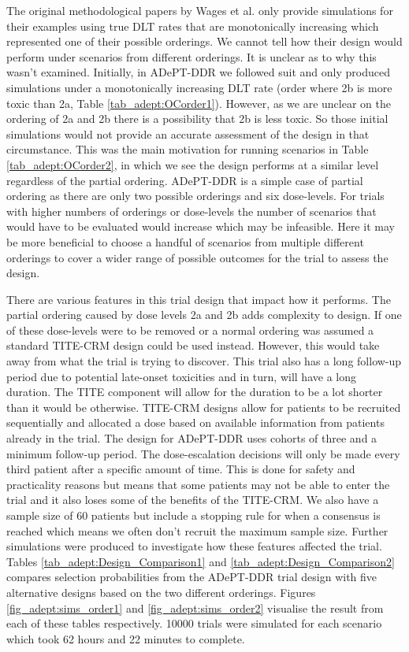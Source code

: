 The original methodological papers by Wages et al. \cite{wagesUsingTimetoeventContinual2013,wagesContinualReassessmentMethod2011} only provide simulations for their examples using true DLT rates that are monotonically increasing which represented one of their possible orderings. We cannot tell how their design would perform under scenarios from different orderings. It is unclear as to why this wasn't examined. Initially, in ADePT-DDR we followed suit and only produced simulations under a monotonically increasing DLT rate (order where 2b is more toxic than 2a, Table \ref{tab_adept:OCorder1}). However, as we are unclear on the ordering of 2a and 2b there is a possibility that 2b is less toxic. So those initial simulations would not provide an accurate assessment of the design in that circumstance. This was the main motivation for running scenarios in Table \ref{tab_adept:OCorder2}, in which we see the design performs at a similar level regardless of the partial ordering. ADePT-DDR is a simple case of partial ordering as there are only two possible orderings and six dose-levels. For trials with higher numbers of orderings or dose-levels the number of scenarios that would have to be evaluated would increase which may be infeasible. Here it may be more beneficial to choose a handful of scenarios from multiple different orderings to cover a wider range of possible outcomes for the trial to assess the design. 

There are various features in this trial design that impact how it performs. The partial ordering caused by dose levels 2a and 2b adds complexity to design. If one of these dose-levels were to be removed or a normal ordering was assumed a standard TITE-CRM design could be used instead. However, this would take away from what the trial is trying to discover. This trial also has a long follow-up period due to potential late-onset toxicities and in turn, will have a long duration. The TITE component will allow for the duration to be a lot shorter than it would be otherwise. TITE-CRM designs allow for patients to be recruited sequentially and allocated a dose based on available information from patients already in the trial. The design for ADePT-DDR uses cohorts of three and a minimum follow-up period. The dose-escalation decisions will only be made every third patient after a specific amount of time. This is done for safety and practicality reasons but means that some patients may not be able to enter the trial and it also loses some of the benefits of the TITE-CRM. We also have a sample size of 60 patients but include a stopping rule for when a consensus is reached which means we often don't recruit the maximum sample size. Further simulations were produced to investigate how these features affected the trial. Tables \ref{tab_adept:Design_Comparison1} and \ref{tab_adept:Design_Comparison2} compares selection probabilities from the ADePT-DDR trial design with five alternative designs based on the two different orderings. Figures \ref{fig_adept:sims_order1} and \ref{fig_adept:sims_order2} visualise the result from each of these tables respectively. 10000 trials were simulated for each scenario which took 62 hours and 22 minutes to complete.  
 
